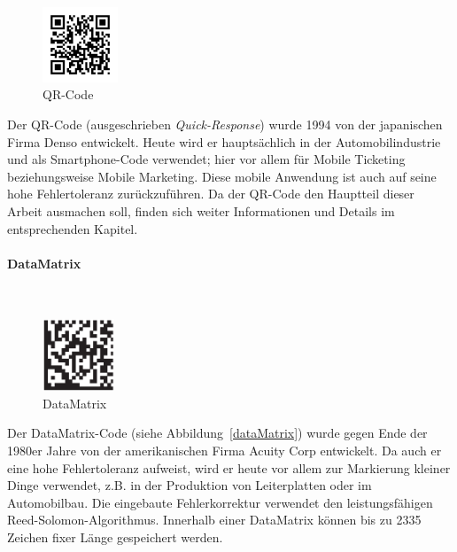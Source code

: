\begin{figure}
	\centering
	\vspace{-0.65cm}
	\includegraphics[width=0.2\textwidth]{Bilder/QR_Code.png}
	\vspace{-0.2cm}
    \caption[QR-Code]{QR-Code\footnotemark}
	\label{qrcode}	
\end{figure}
Der QR-Code (ausgeschrieben \textit{Quick-Response}) wurde 1994 von der japanischen Firma Denso entwickelt. Heute wird er hauptsächlich in der Automobilindustrie und als Smartphone-Code verwendet; hier vor allem für Mobile Ticketing beziehungsweise Mobile Marketing. Diese mobile Anwendung ist auch auf seine hohe Fehlertoleranz zurückzuführen. Da der QR-Code den Hauptteil dieser Arbeit ausmachen soll, finden sich weiter Informationen und Details im entsprechenden Kapitel.

\paragraph{DataMatrix}~

\begin{figure}
	\centering
	\vspace{-0.65cm}
	\includegraphics[width=0.19\textwidth]{Bilder/DataMatrix.png} 
	\vspace{-0.2cm}
	\caption[DataMatrix]{DataMatrix\footnotemark}
	\label{datamatrix}	
\end{figure}
Der DataMatrix-Code (siehe Abbildung~\ref{dataMatrix}) wurde gegen Ende der 1980er Jahre von der amerikanischen Firma Acuity Corp entwickelt. Da auch er eine hohe Fehlertoleranz aufweist, wird er heute vor allem zur Markierung kleiner Dinge verwendet, z.B. in der Produktion von Leiterplatten oder im Automobilbau. Die eingebaute Fehlerkorrektur verwendet den leistungsfähigen Reed-Solomon-Algorithmus. Innerhalb einer DataMatrix können bis zu 2335 Zeichen fixer Länge gespeichert werden.

